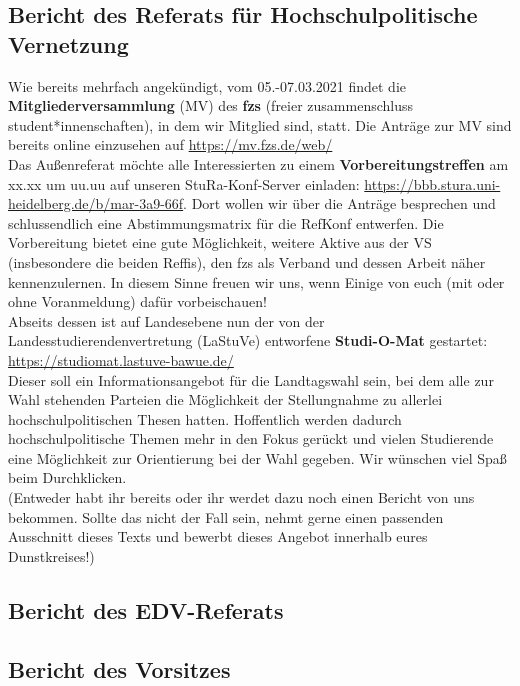 \subsection{Bericht des Referats für Hochschulpolitische Vernetzung}
Wie bereits mehrfach angekündigt, vom 05.-07.03.2021 findet die \textbf{Mitgliederversammlung} (MV) des \textbf{fzs} (freier zusammenschluss student*innenschaften), in dem wir Mitglied sind, statt. Die Anträge zur MV sind bereits online einzusehen auf \url{https://mv.fzs.de/web/}\\
Das Außenreferat möchte alle Interessierten zu einem \textbf{Vorbereitungstreffen} am xx.xx um uu.uu auf unseren StuRa-Konf-Server einladen: \url{https://bbb.stura.uni-heidelberg.de/b/mar-3a9-66f}. Dort wollen wir über die Anträge besprechen und schlussendlich eine Abstimmungsmatrix für die RefKonf entwerfen. Die Vorbereitung bietet eine gute Möglichkeit, weitere Aktive aus der VS (insbesondere die beiden Reffis), den fzs als Verband und dessen Arbeit näher kennenzulernen. In diesem Sinne freuen wir uns, wenn Einige von euch (mit oder ohne Voranmeldung) dafür vorbeischauen!\\
Abseits dessen ist auf Landesebene nun der von der Landesstudierendenvertretung (LaStuVe) entworfene \textbf{Studi-O-Mat} gestartet: \url{https://studiomat.lastuve-bawue.de/}\\
Dieser soll ein Informationsangebot für die Landtagswahl sein, bei dem alle zur Wahl stehenden Parteien die Möglichkeit der Stellungnahme zu allerlei hochschulpolitischen Thesen hatten. Hoffentlich werden dadurch hochschulpolitische Themen mehr in den Fokus gerückt und vielen Studierende eine Möglichkeit zur Orientierung bei der Wahl gegeben. Wir wünschen viel Spaß beim Durchklicken.\\
(Entweder habt ihr bereits oder ihr werdet dazu noch einen Bericht von uns bekommen. Sollte das nicht der Fall sein, nehmt gerne einen passenden Ausschnitt dieses Texts und bewerbt dieses Angebot innerhalb eures Dunstkreises!)

\subsection{Bericht des EDV-Referats}

\subsection{Bericht des Vorsitzes}
